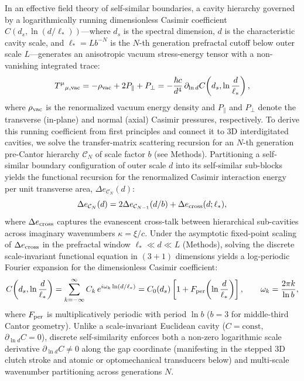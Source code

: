 \documentclass[pdflatex,sn-nature]{sn-jnl}
\begin{document}
In an effective field theory of self-similar boundaries\cite{gordon2026prd}, a cavity hierarchy governed by a logarithmically running dimensionless Casimir coefficient $C(d_s, \ln(d/\ell_*))$---where $d_s$ is the spectral dimension, $d$ is the characteristic cavity scale, and $\ell_* = L b^{-N}$ is the $N$-th generation prefractal cutoff below outer scale $L$---generates an anisotropic vacuum stress-energy tensor with a non-vanishing integrated trace\cite{gordon2026prd}:
\begin{equation}
T^\mu{}_{\mu,\rm vac} = -\rho_{\rm vac} + 2P_\parallel + P_\perp = -\frac{\hbar c}{d^4} \,\partial_{\ln d}C\!\left(d_s, \ln\frac{d}{\ell_*}\right),
\label{eq:trace_running}
\end{equation}
where $\rho_{\rm vac}$ is the renormalized vacuum energy density and $P_\parallel$ and $P_\perp$ denote the transverse (in-plane) and normal (axial) Casimir pressures, respectively. To derive this running coefficient from first principles and connect it to 3D interdigitated cavities, we solve the transfer-matrix scattering recursion for an $N$-th generation pre-Cantor hierarchy $\mathcal{C}_N$ of scale factor $b$ (see Methods). Partitioning a self-similar boundary configuration of outer scale $d$ into its self-similar sub-blocks yields the functional recursion for the renormalized Casimir interaction energy per unit transverse area, $\Delta e_{\mathcal{C}_N}(d)$:
\begin{equation}
\Delta e_{\mathcal{C}_N}(d) = 2 \Delta e_{\mathcal{C}_{N-1}}(d/b) + \Delta e_{\rm cross}(d; \ell_*),
\label{eq:recursion_main}
\end{equation}
where $\Delta e_{\rm cross}$ captures the evanescent cross-talk between hierarchical sub-cavities across imaginary wavenumbers $\kappa = \xi/c$. Under the asymptotic fixed-point scaling of $\Delta e_{\rm cross}$ in the prefractal window $\ell_* \ll d \ll L$ (Methods), solving the discrete scale-invariant functional equation in $(3+1)$ dimensions yields a log-periodic Fourier expansion for the dimensionless Casimir coefficient:
\begin{equation}
C\!\left(d_s, \ln\frac{d}{\ell_*}\right) = \sum_{k=-\infty}^{\infty} C_k \, e^{i \omega_k \ln(d/\ell_*)} = C_0(d_s) \left[ 1 + F_{\rm per}\!\left(\ln\frac{d}{\ell_*}\right) \right], \qquad \omega_k = \frac{2\pi k}{\ln b},
\label{eq:fourier_running}
\end{equation}
where $F_{\rm per}$ is multiplicatively periodic with period $\ln b$ ($b=3$ for middle-third Cantor geometry). Unlike a scale-invariant Euclidean cavity ($C = \text{const}$, $\partial_{\ln d} C = 0$), discrete self-similarity enforces both a non-zero logarithmic scale derivative $\partial_{\ln d} C \neq 0$ along the gap coordinate (manifesting in the stepped 3D clutch stroke and atomic or optomechanical transducers below) and multi-scale wavenumber partitioning across generations $N$.
\end{document}
